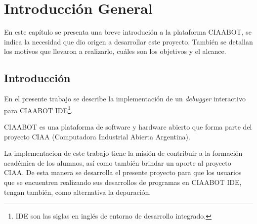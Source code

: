 
\chapter{Introducción General} %

\label{Chapter1} %
\label{IntroGeneral}
En este capítulo se presenta una breve introdución a la plataforma CIAABOT, se
indica la necesidad que dio origen a desarrollar este proyecto. También se detallan
los motivos que llevaron a realizarlo, cuáles son los objetivos y el alcance.


\newcommand{\keyword}[1]{\textbf{#1}}
\newcommand{\tabhead}[1]{\textbf{#1}}
\newcommand{\code}[1]{\texttt{#1}}
\newcommand{\file}[1]{\texttt{\bfseries#1}}
\newcommand{\option}[1]{\texttt{\itshape#1}}
\newcommand{\grados}{$^{\circ}$}



\section{Introducción}
\label{Introducción}
En el presente trabajo se describe la implementación de un \emph{debugger} interactivo
para CIAABOT IDE\footnote{IDE son las siglas en inglés de entorno de desarrollo integrado.}.

CIAABOT es una plataforma de software y hardware abierto que forma parte del proyecto CIAA (Computadora Industrial Abierta Argentina)\citep{CIAA}. 


La implementacion de este trabajo tiene la misión de contribuir a la formación
académica de los alumnos, así como también brindar un aporte al proyecto CIAA.
De esta manera se desarrolla el presente proyecto para que los usuarios que se encuentren
realizando sus desarrollos de programas en CIAABOT IDE, tengan también, como alternativa la depuración.

